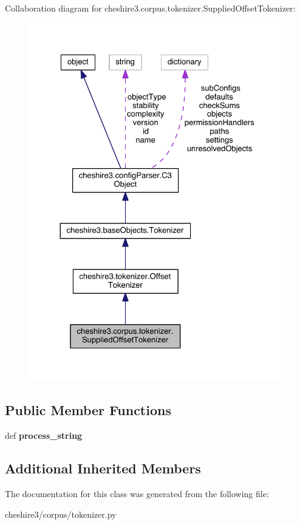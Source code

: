 Collaboration diagram for cheshire3.\-corpus.\-tokenizer.\-Supplied\-Offset\-Tokenizer\-:
\nopagebreak
\begin{figure}[H]
\begin{center}
\leavevmode
\includegraphics[width=326pt]{classcheshire3_1_1corpus_1_1tokenizer_1_1_supplied_offset_tokenizer__coll__graph}
\end{center}
\end{figure}
\subsection*{Public Member Functions}
\begin{DoxyCompactItemize}
\item 
\hypertarget{classcheshire3_1_1corpus_1_1tokenizer_1_1_supplied_offset_tokenizer_a5f6bcd822ee3bd57781d6045f8a0b7a9}{def {\bfseries process\-\_\-string}}\label{classcheshire3_1_1corpus_1_1tokenizer_1_1_supplied_offset_tokenizer_a5f6bcd822ee3bd57781d6045f8a0b7a9}

\end{DoxyCompactItemize}
\subsection*{Additional Inherited Members}


The documentation for this class was generated from the following file\-:\begin{DoxyCompactItemize}
\item 
cheshire3/corpus/tokenizer.\-py\end{DoxyCompactItemize}
